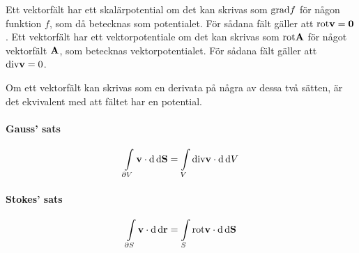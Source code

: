 Ett vektorfält har ett skalärpotential om det kan skrivas som $\text{grad}f$ för någon funktion $f$, som då betecknas som potentialet. För sådana fält gäller att $\text{rot}\vb{v} = \vb{0}$. Ett vektorfält har ett vektorpotentiale om det kan skrivas som $\text{rot}\vb{A}$ för något vektorfält $\vb{A}$, som betecknas vektorpotentialet. För sådana fält gäller att $\text{div}\vb{v} = 0$.

Om ett vektorfält kan skrivas som en derivata på några av dessa två sätten, är det ekvivalent med att fältet har en potential.

\paragraph{Gauss' sats}
\begin{align*}
	\int\limits_{\partial V}\vb{v}\cdot\dd{\dd{\vb{S}}} = \int\limits_{V}\text{div}\vb{v}\cdot\dd{\dd{V}}
\end{align*}

\paragraph{Stokes' sats}
\begin{align*}
	\int\limits_{\partial S}\vb{v}\cdot\dd{\dd{\vb{r}}} = \int\limits_{S}\text{rot}\vb{v}\cdot\dd{\dd{\vb{S}}}
\end{align*}